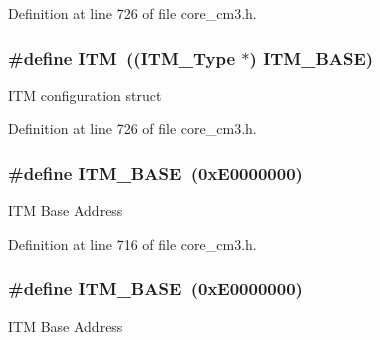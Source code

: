 Definition at line 726 of file core\+\_\+cm3.\+h.

\subsubsection[{\texorpdfstring{I\+TM}{ITM}}]{\setlength{\rightskip}{0pt plus 5cm}\#define I\+TM~(({\bf I\+T\+M\+\_\+\+Type} $\ast$)           {\bf I\+T\+M\+\_\+\+B\+A\+SE})}\hypertarget{group___c_m_s_i_s___c_m3__core__register_gabae7cdf882def602cb787bb039ff6a43}{}\label{group___c_m_s_i_s___c_m3__core__register_gabae7cdf882def602cb787bb039ff6a43}
I\+TM configuration struct 

Definition at line 726 of file core\+\_\+cm3.\+h.

\subsubsection[{\texorpdfstring{I\+T\+M\+\_\+\+B\+A\+SE}{ITM_BASE}}]{\setlength{\rightskip}{0pt plus 5cm}\#define I\+T\+M\+\_\+\+B\+A\+SE~(0x\+E0000000)}\hypertarget{group___c_m_s_i_s___c_m3__core__register_gadd76251e412a195ec0a8f47227a8359e}{}\label{group___c_m_s_i_s___c_m3__core__register_gadd76251e412a195ec0a8f47227a8359e}
I\+TM Base Address 

Definition at line 716 of file core\+\_\+cm3.\+h.

\subsubsection[{\texorpdfstring{I\+T\+M\+\_\+\+B\+A\+SE}{ITM_BASE}}]{\setlength{\rightskip}{0pt plus 5cm}\#define I\+T\+M\+\_\+\+B\+A\+SE~(0x\+E0000000)}\hypertarget{group___c_m_s_i_s___c_m3__core__register_gadd76251e412a195ec0a8f47227a8359e}{}\label{group___c_m_s_i_s___c_m3__core__register_gadd76251e412a195ec0a8f47227a8359e}
I\+TM Base Address 

